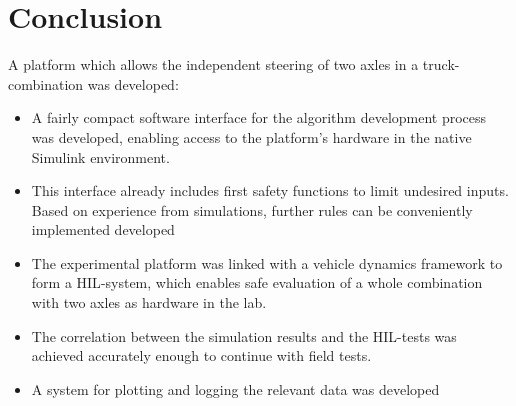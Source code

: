 \documentclass[root.tex]{subfiles}
\begin{document}
{\pagestyle{empty}}
\section{Conclusion}
\label{chap:Conclusion}


A platform which allows the independent steering of two axles in a truck-combination was developed:

\begin{itemize}
	\item A fairly compact software interface for the algorithm development process was developed, enabling access to the platform's hardware in the native Simulink environment. 
	\item This interface already includes first safety functions to limit undesired inputs. Based on experience from simulations, further rules can be conveniently implemented
	developed
	\item The experimental platform was linked with a vehicle dynamics framework to form a \gls{HIL}-system, which enables safe evaluation of a whole combination with two axles as hardware in the lab.
	\item The correlation between the simulation results and the \gls{HIL}-tests was achieved accurately enough to continue with field tests. 
	\item A system for plotting and logging the relevant data was developed
\end{itemize}
  
\end{document}
